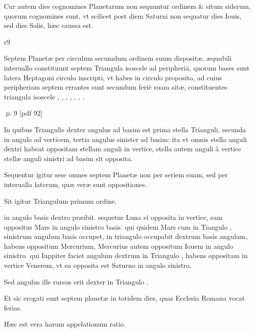 \begin{parnumbers}
Cur autem dies cognomines Planetarum non sequuntur ordinem \& situm siderum, quorum cognomines sunt, vt scilicet post diem Saturni non sequatur dies Iouis, sed dies Solis, hæc caussa est.

\begin{wrapfigure}[9]{r}{9\baselineskip}
\end{wrapfigure}

Septem Planetæ per circulum secumdum ordinem suum dispositæ, æquabili interuallo constituunt septem Triangula isoscele ad peripheriā,  quorum bases sunt latera Heptagoni circulo inscripti, vt habes in circulo proposito, ad cuius peripheriam septem errantes sunt secundum feriē suam sitæ, constituentes triangula isoscele , , , , , , .

\end{parnumbers}
\clearpage
p. 9 [pdf 92]

\begin{parnumbers}
In quibus Triangulis dexter angulus ad basim est prima stella Trianguli, secunda in angulo ad verticem, tertia angulus sinister ad basim: ita vt omnis stella anguli dextri habeat oppositam  stellam anguli in vertice, stella autem anguli à vertice stellæ anguli sinistri ad basim sit opposita.

Sequentur igitur sese omnes septem Planetæ non per seriem suam, sed per interualla laterum, quæ veræ sunt oppositiones.

Sit igitur Triangulum  primum ordine.

 in angulo basis dextro præibit. sequetur Luna ei opposita in vertice, eam oppositus Mars in angulo sinistro basis. qui quidem Mars cum in Tiangulo , sinistrum angulum basis occupet, in triangulo  occupabit dextrum basis angulum, habens oppositum Mercurium, Mercurius autem oppositum Iouem in angulo sinistro. qui Iuppiter faciet angulum dextrum in Triangulo , habens oppositam in vertice  Venerem, vt ea opposita est Saturno in angulo sinistro.

Sed angulus ille rursus erit dexter in Triangulo .

Et sic erogati sunt septem planetæ in totidem dies, quas Ecclesia Romana vocat ferias.

Hæc est vera harum appelationum ratio.

\end{parnumbers}

